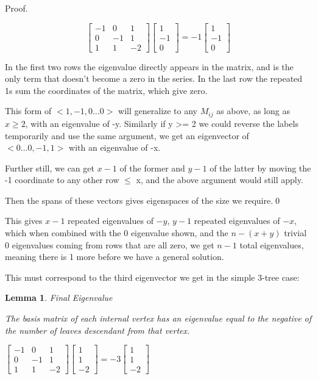 \documentclass[10pt,a4paper]{report}
\newtheorem{lemma}{Lemma}
\begin{document}
Proof.

\begin{equation*}
\left[\begin{matrix}
	-1 & 0 & 1\\
	0 & -1 & 1\\
	1 & 1 & -2
\end{matrix}\right]
\left[\begin{matrix}
	1\\
	-1\\
	0
\end{matrix}\right]
=
-1
\left[\begin{matrix}
	1\\
	-1\\
	0
\end{matrix}\right]
\end{equation*}

In the first two rows the eigenvalue directly appears in the matrix, and is the
only term that doesn't become a zero in the series.
In the last row the repeated 1s sum the coordinates of the matrix, which give
zero.

This form of $<1, -1, 0\ldots 0>$ will generalize to any $M_{ij}$ as above, as
long as $x \geq 2$, with an eigenvalue of -y.
Similarly if y >= 2 we could reverse the labels temporarily and use the same
argument, we get an eigenvector of $<0\ldots 0, -1, 1>$ with an eigenvalue of
-x.

Further still, we can get $x-1$ of the former and $y-1$ of the latter by moving
the -1 coordinate to any other row $\leq$ x, and the above argument would still
apply.

Then the spans of these vectors gives eigenspaces of the size we require.\qed{}


This gives $x-1$ repeated eigenvalues of $-y$, $y-1$ repeated eigenvalues of
$-x$, which when combined with the 0 eigenvalue shown, and the $n - (x + y)$
trivial $0$ eigenvalues coming from rows that are all zero, we get $n-1$ total
eigenvalues, meaning there is 1 more before we have a general solution.

This must correspond to the third eigenvector we get in the simple 3-tree case:

\begin{lemma} Final Eigenvalue

	The basis matrix of each internal vertex has an eigenvalue equal to the
	negative of the number of leaves descendant from that vertex.
\end{lemma}

$
\left[\begin{matrix}
	-1 & 0 & 1\\
	0 & -1 & 1\\
	1 & 1 & -2
\end{matrix}\right]
\left[\begin{matrix}
	1\\
	1\\
	-2
\end{matrix}\right]
=
-3
\left[\begin{matrix}
	1\\
	1\\
	-2
\end{matrix}\right]
$
\end{document}
